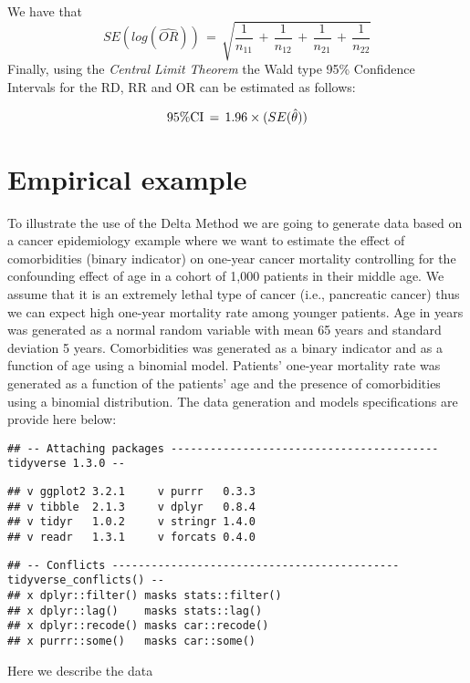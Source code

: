 \documentclass[
]{article}
\begin{document}
We have that
\[SE(log(\widehat{OR}))\,=\, \sqrt{\frac{1}{n_{11}}\,+\,\frac{1}{n_{12}}\,+\,\frac{1}{n_{21}}\,+\,\frac{1}{n_{22}}}\]
Finally, using the \emph{Central Limit Theorem} the Wald type 95\%
Confidence Intervals for the RD, RR and OR can be estimated as follows:

\[95\%\text{CI}\,=\,1.96\times\text(SE(\hat\theta))\]

\hypertarget{empirical-example}{%
\section{Empirical example}\label{empirical-example}}

To illustrate the use of the Delta Method we are going to generate data
based on a cancer epidemiology example where we want to estimate the
effect of comorbidities (binary indicator) on one-year cancer mortality
controlling for the confounding effect of age in a cohort of 1,000
patients in their middle age. We assume that it is an extremely lethal
type of cancer (i.e., pancreatic cancer) thus we can expect high
one-year mortality rate among younger patients. Age in years was
generated as a normal random variable with mean 65 years and standard
deviation 5 years. Comorbidities was generated as a binary indicator and
as a function of age using a binomial model. Patients\(’\) one-year
mortality rate was generated as a function of the patients\(’\) age and
the presence of comorbidities using a binomial distribution. The data
generation and models specifications are provide here below:

\begin{verbatim}
## -- Attaching packages ----------------------------------------- tidyverse 1.3.0 --
\end{verbatim}

\begin{verbatim}
## v ggplot2 3.2.1     v purrr   0.3.3
## v tibble  2.1.3     v dplyr   0.8.4
## v tidyr   1.0.2     v stringr 1.4.0
## v readr   1.3.1     v forcats 0.4.0
\end{verbatim}

\begin{verbatim}
## -- Conflicts -------------------------------------------- tidyverse_conflicts() --
## x dplyr::filter() masks stats::filter()
## x dplyr::lag()    masks stats::lag()
## x dplyr::recode() masks car::recode()
## x purrr::some()   masks car::some()
\end{verbatim}

Here we describe the data
\end{document}
